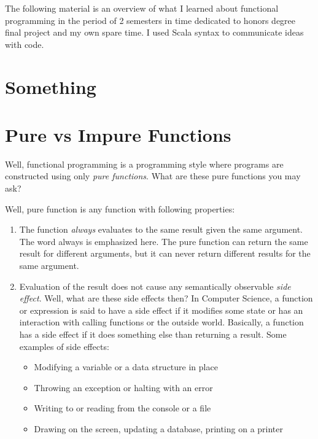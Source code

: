 \documentclass[12pt,twoside,a4paper]{report}
\begin{document}
The following material is an overview of what I learned about functional programming in the period of 2 semesters in time dedicated to honors degree final project and my own spare time. I used Scala syntax to communicate ideas with code.

\section{Something}\label{6.3}

\section{Pure vs Impure Functions}\label{6.4}
Well, functional programming is a programming style where programs are constructed using only \emph{pure functions}. What are these pure functions you may ask? 

Well, pure function is any function with following properties:

\begin{enumerate}\itemsep1pt \parskip0pt 
\item The function \emph{always} evaluates to the same result given the same argument. The word always is emphasized here. The pure function can return the same result for different arguments, but it can never return different results for the same argument.
\item Evaluation of the result does not cause any semantically observable \emph{side effect}. Well, what are these side effects then? In Computer Science, a function or expression is said to have a side effect if it modifies some state or has an interaction with calling functions or the outside world. Basically, a function has a side effect if it does something else than returning a result. Some examples of side effects:

\begin{itemize}\itemsep1pt \parskip0pt 
\item Modifying a variable or a data structure in place
\item Throwing an exception or halting with an error
\item Writing to or reading from the console or a file
\item Drawing on the screen, updating a database, printing on a printer
\end{itemize}
\end{enumerate}
\end{document}
